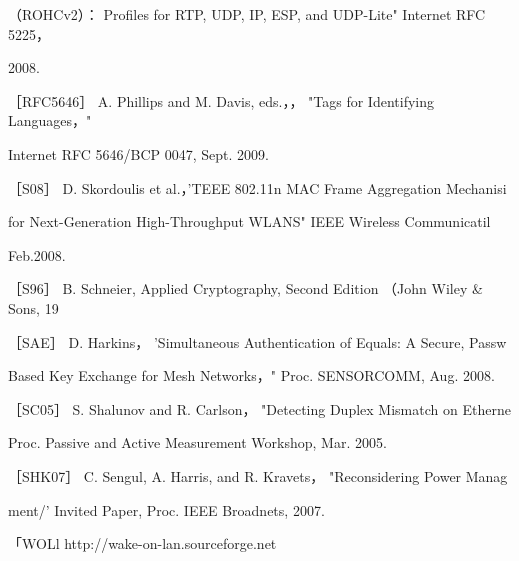 （ROHCv2）： Profiles for RTP, UDP, IP, ESP, and UDP-Lite" Internet RFC 5225，

2008.

［RFC5646］ A. Phillips and M. Davis, eds.，， "Tags for Identifying Languages，"

Internet RFC 5646/BCP 0047, Sept. 2009.

［S08］ D. Skordoulis et al.，'TEEE 802.11n MAC Frame Aggregation Mechanisi

for Next-Generation High-Throughput WLANS" IEEE Wireless Communicatil

Feb.2008.

［S96］ B. Schneier, Applied Cryptography, Second Edition （John Wiley \& Sons, 19

［SAE］ D. Harkins， 'Simultaneous Authentication of Equals: A Secure, Passw

Based Key Exchange for Mesh Networks，" Proc. SENSORCOMM, Aug. 2008.

［SC05］ S. Shalunov and R. Carlson， "Detecting Duplex Mismatch on Etherne

Proc. Passive and Active Measurement Workshop, Mar. 2005.

［SHK07］ C. Sengul, A. Harris, and R. Kravets， "Reconsidering Power Manag

ment/' Invited Paper, Proc. IEEE Broadnets, 2007.

「WOLl http://wake-on-lan.sourceforge.net